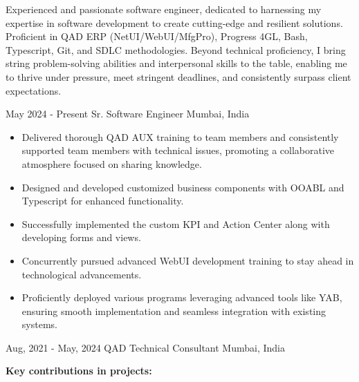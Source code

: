 \documentclass{curriculum-vitae}
\begin{document}


Experienced and passionate software engineer, dedicated to harnessing my expertise in software development to
create cutting-edge and resilient solutions. Proficient in QAD ERP (NetUI/WebUI/MfgPro), Progress 4GL,
Bash, Typescript, Git, and SDLC methodologies. Beyond technical proficiency, I bring string problem-solving
abilities and interpersonal skills to the table, enabling me to thrive under pressure, meet stringent deadlines, and
consistently surpass client expectations.


{May 2024 - Present}
{Sr. Software Engineer}
{Mumbai, India}

\begin{itemize}
   \item Delivered thorough QAD AUX training to team members and consistently
      supported team members with technical issues, promoting a collaborative
      atmosphere focused on sharing knowledge.
   \item Designed and developed customized business components with OOABL and
      Typescript for enhanced functionality.
   \item Successfully implemented the custom KPI and Action Center along with
      developing forms and views.
   \item Concurrently pursued advanced WebUI development training to stay ahead
      in technological advancements.
   \item Proficiently deployed various programs leveraging advanced tools like
      YAB, ensuring smooth implementation and seamless integration with
      existing systems.
\end{itemize}

{Aug, 2021 - May, 2024}
{QAD Technical Consultant}
{Mumbai, India}

\textbf{Key contributions in projects:}
\end{document}
